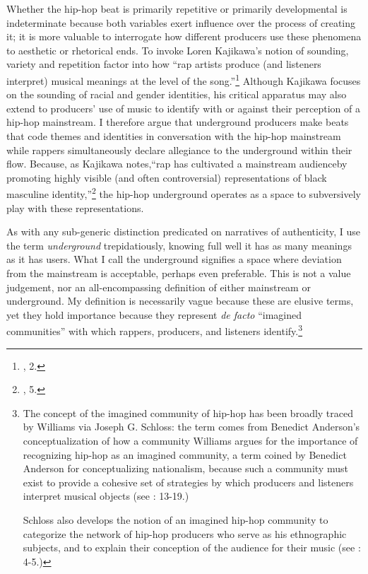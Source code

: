 Whether the hip-hop beat is primarily repetitive or primarily developmental is indeterminate because both variables exert influence over the process of creating it; it is more valuable to interrogate how different producers use these phenomena to aesthetic or rhetorical ends. To invoke Loren Kajikawa's notion of sounding, variety and repetition factor into how ``rap artists produce (and listeners interpret) musical meanings at the level of the song.''\footnote{\cite{lorenkajikawaSoundingRaceRap2015}, 2.} Although Kajikawa focuses on the sounding of racial and gender identities, his critical apparatus may also extend to producers' use of music to identify with or against their perception of a hip-hop mainstream. I therefore argue that underground producers make beats that code themes and identities in conversation with the hip-hop mainstream while rappers simultaneously declare allegiance to the underground within their flow. Because, as Kajikawa notes,``rap has cultivated a mainstream audience\textellipsis by promoting highly visible (and often controversial) representations of black masculine identity,''\footnote{\cite{lorenkajikawaSoundingRaceRap2015}, 5.} the hip-hop underground operates as a space to subversively play with these representations.

As with any sub-generic distinction predicated on narratives of authenticity, I use the term \emph{underground} trepidatiously, knowing full well it has as many meanings as it has users. What I call the underground signifies a space where deviation from the mainstream is acceptable, perhaps even preferable. This is not a value judgement, nor an all-encompassing definition of either mainstream or underground. My definition is necessarily vague because these are elusive terms, yet they hold importance because they represent \textit{de facto} ``imagined communities'' with which rappers, producers, and listeners identify.\footnote{The concept of the imagined community of hip-hop has been broadly traced by Williams via Joseph G. Schloss: the term comes from Benedict Anderson's conceptualization of how a community Williams argues for the importance of recognizing hip-hop as an imagined community, a term coined by Benedict Anderson for conceptualizing nationalism, because such a community must exist to provide a cohesive set of strategies by which producers and listeners interpret musical objects (see \cite{justinawilliamsRhyminStealinMusical2013}: 13-19.) 

Schloss also develops the notion of an imagined hip-hop community to categorize the network of hip-hop producers who serve as his ethnographic subjects, and to explain their conception of the audience for their music (see \cite{josephgschlossMakingBeatsArt2004}: 4-5.)}

